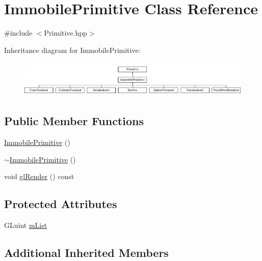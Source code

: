 \hypertarget{class_immobile_primitive}{\section{Immobile\-Primitive Class Reference}
\label{class_immobile_primitive}
}


{\ttfamily \#include $<$Primitive.\-hpp$>$}

Inheritance diagram for Immobile\-Primitive\-:\begin{figure}[H]
\begin{center}
\leavevmode
\includegraphics[height=1.777778cm]{class_immobile_primitive}
\end{center}
\end{figure}
\subsection*{Public Member Functions}
\begin{DoxyCompactItemize}
\item 
\hyperlink{class_immobile_primitive_a704ab830afc7d755d015977e30261355}{Immobile\-Primitive} ()
\item 
\hyperlink{class_immobile_primitive_a7d30116ce4bece945e95a5157ef053d8}{$\sim$\-Immobile\-Primitive} ()
\item 
void \hyperlink{class_immobile_primitive_ac6307f4bb055921e8727fd9a08d5dcce}{gl\-Render} () const 
\end{DoxyCompactItemize}
\subsection*{Protected Attributes}
\begin{DoxyCompactItemize}
\item 
G\-Luint \hyperlink{class_immobile_primitive_ae8a9856047b36aad734a887fc8361610}{m\-List}
\end{DoxyCompactItemize}
\subsection*{Additional Inherited Members}


